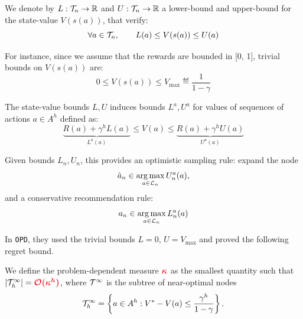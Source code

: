 \documentclass{article}
\begin{document}
\begin{definition}

We denote by $L:\mathcal{T}_n \rightarrow \mathbb{R}$ and  $U:\mathcal{T}_n \rightarrow \mathbb{R}$ a lower-bound and upper-bound for the state-value $V(s(a))$, that verify:
\begin{equation*}
    \forall a\in\mathcal{T}_n, \qquad L(a) \leq V(s(a)) \leq U(a)
\end{equation*}

For instance, since we assume that the rewards are bounded in [0, 1], trivial bounds on $V(s(a))$ are:
\[0 \leq V(s(a)) \leq V_{\max} \eqdef \frac{1}{1-\gamma} \]

The state-value bounds $L,U$ induces bounds $L^a, U^a$ for values of sequences of actions $a\in A^h$ defined as:
\begin{equation}
\label{eq:sequence_value}
    \underbrace{R(a) + \gamma^{h} L(a)}_{L^a(a)} \leq V(a) \leq \underbrace{R(a) + \gamma^{h} U(a)}_{U^a(a)}
\end{equation}
\end{definition}

Given bounds $L_n, U_n$, this provides an optimistic sampling rule: expand the node
\begin{equation}
    \label{eq:sampling_rule}
    \hat{a}_n \in \operatorname*{arg\,max}_{a\in\mathcal{L}_n} U_n^a(a),
\end{equation}
and a conservative recommendation rule:
\begin{equation}
    \label{eq:recommendation_rule}
    a_n \in \operatorname*{arg\,max}_{a\in\mathcal{L}_n} L^a_n(a)
\end{equation}

In \texttt{OPD}, they used the trivial bounds $L=0,\,U=V_{\max}$ and proved the following regret bound.

\begin{definition}
We define the problem-dependent measure $\hlrb{\kappa}$ as the smallest quantity such that $|\Tau_h^\infty| = \hlrb{\cO(\kappa^h)}$, where $\mathcal{T}^\infty$ is the subtree of near-optimal nodes $$\mathcal{T}_h^\infty = \left\{a\in A^h: V^*-V(a) \leq \frac{\gamma^h}{1-\gamma}\right\}.$$
\end{definition}
\noindent{}
\end{document}
